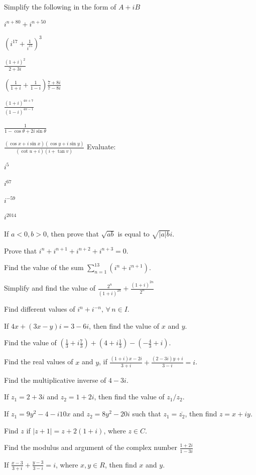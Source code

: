 \noindent Simplify the following in the form of $A + iB$
\item $i^{n + 80} + i^{n + 50}$
\item $\left(i^{17} + \frac{1}{i^{15}}\right)^3$
\item $\frac{(1 + i)^2}{2 + 3i}$
\item $\left(\frac{1}{1 + i} + \frac{1}{1 - i}\right)\frac{7 + 8i}{7 - 8i}$
\item $\frac{(1 + i)^{4n + 7}}{(1 - i)^{4n - 1}}$
\item $\frac{1}{1 - \cos\theta + 2i\sin\theta}$
\item $\frac{(\cos x + i\sin x)(\cos y + i\sin y)}{(\cot u + i)(i + \tan v)}$
\noindent Evaluate:
\item $i^5$
\item $i^{67}$
\item $i^{-59}$
\item $i^{2014}$
\item If $a<0, b>0$, then prove that $\sqrt{ab}$ is equal to $\sqrt{|a|b}i$.
\item Prove that $i^n + i^{n + 1} + i^{n + 2} + i^{n + 3} = 0$.
\item Find the value of the sum $\displaystyle\sum_{n = 1}^{13}(i^n + i^{n + 1})$.
\item Simplify and find the value of $\frac{2^n}{(1 + i)^{2n}} + \frac{(1 + i)^{2n}}{2^n}$
\item Find different values of $i^n + i^{-n}, \,\forall\,n\in I$.
\item If $4x + (3x - y)i = 3 - 6i$, then find the value of $x$ and $y$.
\item Find the value of $\left(\frac{1}{3} + i\frac{7}{3}\right) + \left(4 + i\frac{1}{3}\right) - \left(-\frac{4}{3} + i\right)$.
\item Find the real values of $x$ and $y$, if $\frac{(1 + i)x - 2i}{3 + i} + \frac{(2 - 3i)y + i}{3 - i} = i$.
\item Find the multiplicative inverse of $4 - 3i$.
\item If $z_1 = 2 + 3i$ and $z_2 = 1 + 2i$, then find the value of $z_1/z_2$.
\item If $z_1 = 9y^2 - 4 -i10x$ and $z_2 = 8y^2 -20i$ such that $z_1 = \overline{z_2}$, then find $z = x + iy$.
\item Find $z$ if $|z + 1| = z + 2(1 + i)$, where $z\in C$.
\item Find the modulus and argument of the complex number $\frac{1 + 2i}{1 - 3i}$
\item If $\frac{x - 3}{3 + i} + \frac{y - 3}{3 - i} = i$, where $x, y \in R$, then find $x$ and $y$.
